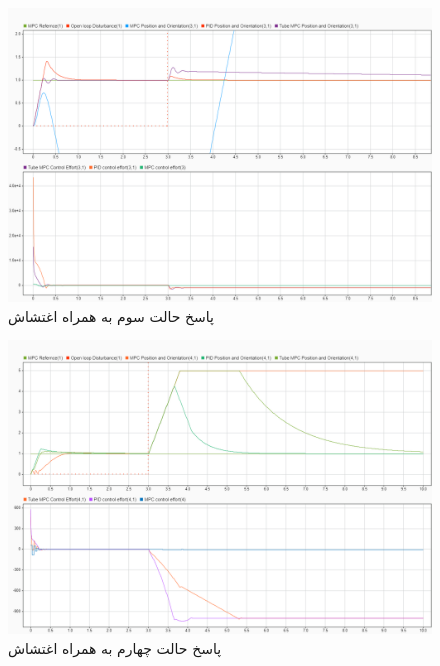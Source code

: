 \begin{figure}[H]
	\centering
	\includegraphics[width=1\linewidth]{../img/Disturbance_ResponseS3}
	\caption{پاسخ حالت سوم به همراه اغتشاش}
	\label{fig:disturbanceresponses3}
\end{figure}
\begin{figure}[H]
	\centering
	\includegraphics[width=1\linewidth]{../img/Disturbance_ResponseS4}
	\caption{پاسخ حالت چهارم به همراه اغتشاش}
	\label{fig:disturbanceresponses4}
\end{figure}
